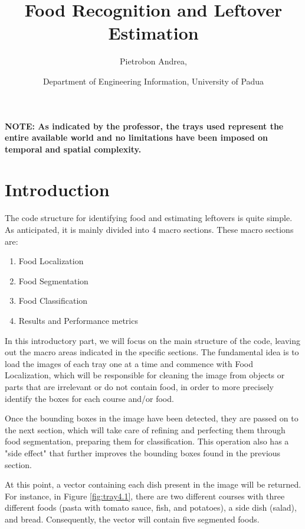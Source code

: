 \documentclass[
	a4paper, %
	10pt, %
	unnumberedsections, %
	twoside, %
]{LTJournalArticle}
\title{Food Recognition and Leftover Estimation} %
\author{Pietrobon Andrea,}
\date{Department of Engineering Information, University of Padua}
\begin{document}
\maketitle %

\textbf{NOTE: As indicated by the professor, the trays used represent the entire available world and no limitations have been imposed on temporal and spatial complexity.}

\section{Introduction}
The code structure for identifying food and estimating leftovers is quite simple.
As anticipated, it is mainly divided into 4 macro sections.
These macro sections are:
\begin{enumerate}
	\item Food Localization
	\item Food Segmentation
	\item Food Classification
	\item Results and Performance metrics
\end{enumerate}

In this introductory part, we will focus on the main structure of the code, leaving out the macro areas indicated in the specific sections. The fundamental idea is to load the images of each tray one at a time and commence with Food Localization, which will be responsible for cleaning the image from objects or parts that are irrelevant or do not contain food, in order to more precisely identify the boxes for each course and/or food.

Once the bounding boxes in the image have been detected, they are passed on to the next section, which will take care of refining and perfecting them through food segmentation, preparing them for classification. This operation also has a "side effect" that further improves the bounding boxes found in the previous section.

At this point, a vector containing each dish present in the image will be returned. For instance, in Figure \ref{fig:tray4.1}, there are two different courses with three different foods (pasta with tomato sauce, fish, and potatoes), a side dish (salad), and bread. Consequently, the vector will contain five segmented foods.
\end{document}
